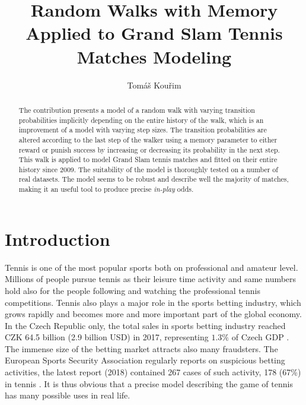 \documentclass{easychair}
\title{Random Walks with Memory Applied to Grand Slam Tennis Matches Modeling}
\author{Tomáš Kouřim}
\institute{
  Institute of Information Theory and Automation, Czech Academy of Sciences
  Prague, Czech Republic\\
  \email{kourim@outlook.com}
 }
\begin{document}
\maketitle
\begin{abstract}
The contribution presents a model of a random walk with varying transition
probabilities implicitly depending on the entire history of the walk,
which is an improvement of a model with varying step sizes. The transition
probabilities are altered according to the last step of the walker
using a memory parameter to either reward or punish success by increasing
or decreasing its probability in the next step. This walk is applied
to model Grand Slam tennis matches and fitted on their entire history
since 2009. The suitability of the model is thoroughly tested on a
number of real datasets. The model seems to be robust and describe
well the majority of matches, making it an useful tool to produce
precise \emph{in-play} odds.
\end{abstract}



\section{Introduction}

Tennis is one of the most popular sports both on professional and
amateur level. Millions of people pursue tennis as their leisure time
activity \cite{pac2019report} and same numbers hold also for the
people following and watching the professional tennis competitions.
Tennis also plays a major role in the sports betting industry, which
grows rapidly and becomes more and more important part of the global
economy. In the Czech Republic only, the total sales in sports betting
industry reached CZK 64.5 billion (2.9 billion USD) in 2017, representing
$1.3\%$ of Czech GDP \cite{mf2017report}. The immense size of the
betting market attracts also many fraudsters. The European Sports
Security Association regularly reports on suspicious betting activities,
the latest report (2018) contained 267 cases of such activity, 178
(67\%) in tennis \cite{essa2018fullreport}. It is thus obvious that
a precise model describing the game of tennis has many possible uses
in real life.
\end{document}

